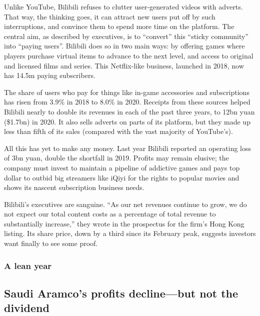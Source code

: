 \documentclass{article}
\begin{document}
Unlike YouTube, Bilibili refuses to clutter user-generated videos with adverts. That way, the thinking goes, it can attract new users put off by such interruptions, and convince them to spend more time on the platform. The central aim, as described by executives, is to ``convert'' this ``sticky community'' into ``paying users''. Bilibili does so in two main ways: by offering games where players purchase virtual items to advance to the next level, and access to original and licensed films and series. This Netflix-like business, launched in 2018, now has 14.5m paying subscribers. 

The share of users who pay for things like in-game accessories and subscriptions has risen from 3.9\% in 2018 to 8.0\% in 2020. Receipts from these sources helped Bilibili nearly to double its revenues in each of the past three years, to 12bn yuan (\$1.7bn) in 2020. It also sells adverts on parts of its platform, but they made up less than fifth of its sales (compared with the vast majority of YouTube's). 

All this has yet to make any money. Last year Bilibili reported an operating loss of 3bn yuan, double the shortfall in 2019. Profits may remain elusive; the company must invest to maintain a pipeline of addictive games and pays top dollar to outbid big streamers like iQiyi for the rights to popular movies and shows its nascent subscription business needs. 

Bilibili's executives are sanguine. ``As our net revenues continue to grow, we do not expect our total content costs as a percentage of total revenue to substantially increase,'' they wrote in the prospectus for the firm's Hong Kong listing. Its share price, down by a third since its February peak, suggests investors want finally to see some proof. {} 
\clearpage
\subsubsection{A lean year }
\subsection{Saudi Aramco's profits decline---but not the dividend }
\end{document}
